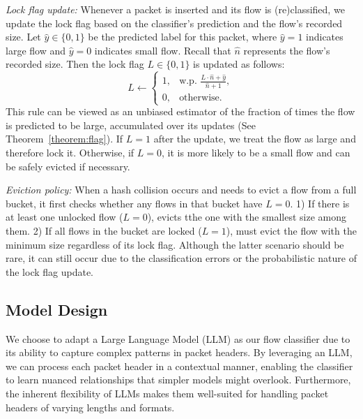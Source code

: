 \textit{Lock flag update:}
%
Whenever a packet is inserted and its flow is (re)classified, we update the lock flag based on the classifier’s prediction and the flow’s recorded size.
%
Let \(\hat{y} \in \{0, 1\}\) be the predicted label for this packet, where \(\hat{y} = 1\) indicates large flow and \(\hat{y} = 0\) indicates small flow.
%
Recall that \(\hat{n}\) represents the flow's recorded size.
%
Then the lock flag \(L \in \{0, 1\}\) is updated as follows:
%
\[
L \leftarrow
\begin{cases} 
1, & \text{w.p. } \frac{L \cdot \hat{n} + \hat{y}}{\hat{n} + 1},\\
0, & \text{otherwise}.
\end{cases}
\]
%
This rule can be viewed as an unbiased estimator of the fraction of times the flow is predicted to be large, accumulated over its updates (See Theorem~\ref{theorem:flag}). If \(L = 1\) after the update, we treat the flow as large and therefore lock it. Otherwise, if \(L = 0\), it is more likely to be a small flow and can be safely evicted if necessary.


\textit{Eviction policy:}
%
When a hash collision occurs and \alg{} needs to evict a flow from a full bucket, it first checks whether any flows in that bucket have \(L = 0\). 1) If there is at least one unlocked flow (\(L = 0\)), \alg{} evicts tthe one with the smallest size among them. 2) If all flows in the bucket are locked (\(L = 1\)), \alg{} must evict the flow with the minimum size regardless of its lock flag. Although the latter scenario should be rare, it can still occur due to the classification errors or the probabilistic nature of the lock flag update.






\subsection{Model Design}
\label{sec:alg:model}


We choose to adapt a Large Language Model (LLM) as our flow classifier due to its ability to capture complex patterns in packet headers. By leveraging an LLM, we can process each packet header in a contextual manner, enabling the classifier to learn nuanced relationships that simpler models might overlook. Furthermore, the inherent flexibility of LLMs makes them well-suited for handling packet headers of varying lengths and formats.




